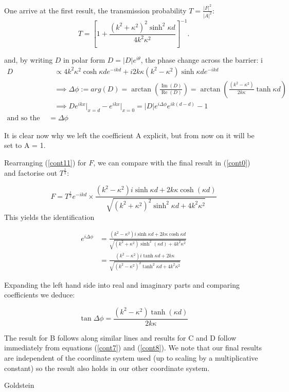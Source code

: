 \documentclass{article}
\begin{document}
One arrive at the first result, the transmission probability $T = \frac{|F|^2}{|A|^2}$:
\[
	T = [1+\frac{(k^2+\kappa^2)^2\sinh^2{\kappa d}}{4k^2\kappa^2}]^{-1}
.\] 

and, by writing $D$ in polar form $D = |D|e^{i\theta}$, the phase change across the barrier:
i
\begin{align}
	D &\propto 4k^2\kappa^2 \cosh{\kappa d}e^{-ikd}+i2k\kappa(k^2-\kappa^2)\sinh{\kappa d}e^{-ikd} \\
	  &\implies \Delta \phi := arg(D) = \arctan\left(\frac{\operatorname{Im}(D)}{\operatorname{Re}(D)}\right) = \arctan\left(\frac{(k^2-\kappa^2)}{2k\kappa}\tanh{\kappa d}\right) \\
	  &\implies De^{ikx}\rvert_{x=d}-e^{ikx}\rvert_{x=0} = |D|e^{i\Delta \phi}e^{ik(d-d)}-1 \\
	  \text{and so the phase change} = \Delta \phi
\end{align}

It is clear now why we left the coefficient A explicit, but from now on it will be set to A = 1.

Rearranging (\ref{cont11}) for $F$, we can compare with the final result in (\ref{cont0}) and factorise out $T^\frac{1}{2}$:

\[
	F = T^{\frac{1}{2}}e^{-ikd} \times \frac{(k^2-\kappa^2)i\sinh{\kappa d}+2k\kappa \cosh(\kappa d)}{\sqrt{(k^2+\kappa^2)^2\sinh^{2}{\kappa d}+4k^2\kappa^2}}
\] 
This yields the identification

\begin{align}
	e^{i\Delta\phi} &= \frac{(k^2-\kappa^2)i\sinh{\kappa d}+2k\kappa \cosh{\kappa d}}{\sqrt{(k^2+\kappa^2)\sinh^{2}(\kappa d)+4k^2\kappa^2}} \\
			&= \frac{(k^2-\kappa^2)i\tanh{\kappa d}+2k\kappa}{\sqrt{(k^2-\kappa^2)^2\tanh^2{\kappa d}+4k^2\kappa^2}}
\end{align}

Expanding the left hand side into real and imaginary parts and comparing coefficients we deduce:

\[
	\tan{\Delta\phi} = \frac{(k^2-\kappa^2)\tanh(\kappa d)}{2k\kappa}
\] 

The result for B follows along similar lines and results for C and D follow immediately from equations (\ref{cont7}) and (\ref{cont8}). We note that our final results are independent of the coordinate system used (up to scaling by a multiplicative constant) so the result also holds in our other coordinate system.

\begin{thebibliography}{100}
Goldstein

\end{thebibliography}
\end{document}
